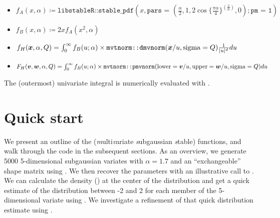 \begin{itemize}


\item $f_A(x, \alpha) \coloneqq \texttt{libstableR::stable\_pdf}(x,
  \texttt{pars = } \left(\frac{\alpha}{2}, 1, 2 \cos \{ \frac{\pi \alpha}{4}
  \}^{\left(\frac{2}{\alpha}\right)}   , 0\right); \texttt{pm = 1})$


  
\item $f_B(x, \alpha) \coloneqq 2 x f_A(x^2, \alpha)$

\item $f_{H}(\bm{x}, \alpha, Q) = \int_0^{\infty} f_B(u; \alpha)
  \times  \texttt{mvtnorm::dmvnorm}(\bm{x} / u, {\rm sigma}= Q) \frac{1}{|u|^d} du$

\item $F_{H}(\bm{v}, \bm{w}, \alpha, Q) = \int_0^{\infty} 
f_B(u; \alpha) \times 
\texttt{mvtnorm::pmvnorm}({\rm lower} =\bm{v}/u, {\rm upper}=\bm{w}/u,
{\rm sigma}=Q) du$ 
\end{itemize}

The (outermost) univariate integral is numerically evaluated with
.

\pagebreak

\section{Quick start}

We present an outline of the 
(\emph{m}ulti\emph{v}ariate \emph{s}ubgaussian \emph{s}table)
functions, and walk through the code in the subsequent sections. As an
overview, we generate 5000 5-dimensional subgaussian variates with
$\alpha=1.7$ and an ``exchangeable'' shape matrix using .
We then recover the parameters with an illustrative call to
. We can calculate the density () at the
center of the distribution and get a quick estimate of the
distribution between -2 and 2 for each member of the 5-dimensional
variate using .  We investigate a refinement of that
quick distribution estimate using .

